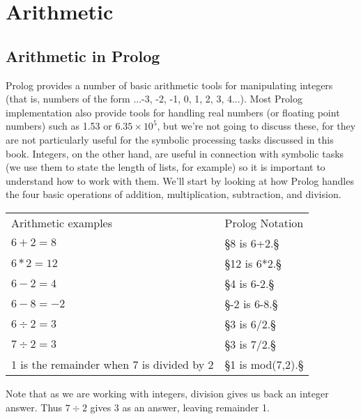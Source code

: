 
\chapter{Arithmetic}\label{CHAPTER5}


\section{Arithmetic in Prolog}\label{SEC.L5.ARITHMETIC}



Prolog provides a number of basic arithmetic tools for manipulating
integers (that is, numbers of the form ...-3, -2, -1, 0, 1, 2, 3,
4...).  Most Prolog implementation also provide tools for handling
real numbers (or floating point numbers) such as 1.53 or $6.35\times
10^{5}$, but we're not going to discuss these, for they are not
particularly useful for the symbolic processing tasks discussed in
this book.  Integers, on the other hand, are useful in connection with
symbolic tasks (we use them to state the length of lists, for example)
so it is important to understand how to work with them.  We'll start
by looking at how Prolog handles the four basic operations of
addition, multiplication, subtraction, and division.

\begin{center}\begin{tabular}{ll}
Arithmetic examples & Prolog Notation\\
$6+2=8$&§8 is 6+2.§\\
$6*2=12$&§12 is 6*2.§\\
$6-2=4$&§4 is 6-2.§\\
$6-8=-2$&§-2 is 6-8.§\\
$6\div 2=3$&§3 is 6/2.§\\
$7\div 2=3$&§3 is 7/2.§\\
1 is the remainder when 7 is divided by 2&§1 is mod(7,2).§
\end{tabular}\end{center}
Note that as we are working with integers, division gives us back an
integer answer.  Thus $7\div 2$ gives 3 as an answer,  leaving
remainder 1.

